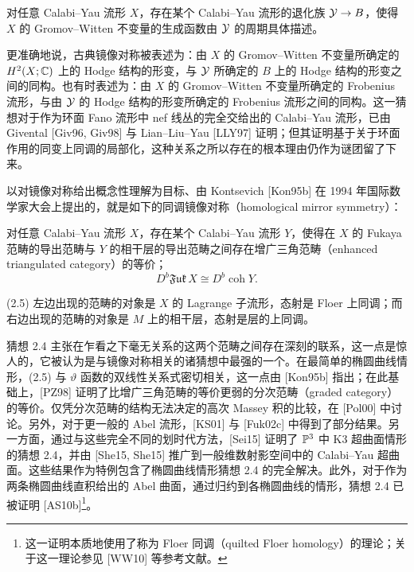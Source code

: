  对任意 Calabi–Yau 流形 $X$，存在某个 Calabi–Yau 流形的退化族 $\mathcal{Y}\to B$，使得 $X$ 的 Gromov–Witten 不变量的生成函数由 $\mathcal{Y}$ 的周期具体描述。

更准确地说，古典镜像对称被表述为：由 $X$ 的 Gromov–Witten 不变量所确定的 $H^2(X;\mathbb{C})$ 上的 Hodge 结构的形变，与 $\mathcal{Y}$ 所确定的 $B$ 上的 Hodge 结构的形变之间的同构。也有时表述为：由 $X$ 的 Gromov–Witten 不变量所确定的 Frobenius 流形，与由 $\mathcal{Y}$ 的 Hodge 结构的形变所确定的 Frobenius 流形之间的同构。这一猜想对于作为环面 Fano 流形中 nef 线丛的完全交给出的 Calabi–Yau 流形，已由 Givental [Giv96, Giv98] 与 Lian–Liu–Yau [LLY97] 证明；但其证明基于关于环面作用的同变上同调的局部化，这种关系之所以存在的根本理由仍作为谜团留了下来。

以对镜像对称给出概念性理解为目标、由 Kontsevich [Kon95b] 在 1994 年国际数学家大会上提出的，就是如下的同调镜像对称（homological mirror symmetry）：

 对任意 Calabi–Yau 流形 $X$，存在某个 Calabi–Yau 流形 $Y$，使得在 $X$ 的 Fukaya 范畴的导出范畴与 $Y$ 的相干层的导出范畴之间存在增广三角范畴（enhanced triangulated category）的等价；
\begin{equation}
    D^b\mathfrak{Fuk}\,X\cong D^b\operatorname{coh}Y. \tag{2.5}
\end{equation}

(2.5) 左边出现的范畴的对象是 $X$ 的 Lagrange 子流形，态射是 Floer 上同调；而右边出现的范畴的对象是 $M$ 上的相干层，态射是层的上同调。


猜想 2.4 主张在乍看之下毫无关系的这两个范畴之间存在深刻的联系，这一点是惊人的，它被认为是与镜像对称相关的诸猜想中最强的一个。在最简单的椭圆曲线情形，(2.5) 与 $\vartheta$ 函数的双线性关系式密切相关，这一点由 [Kon95b] 指出；在此基础上，[PZ98] 证明了比增广三角范畴的等价更弱的分次范畴（graded category）的等价。仅凭分次范畴的结构无法决定的高次 Massey 积的比较，在 [Pol00] 中讨论。另外，对于更一般的 Abel 流形，[KS01] 与 [Fuk02c] 中得到了部分结果。另一方面，通过与这些完全不同的划时代方法，[Sei15] 证明了 $\mathbb{P}^3$ 中 K3 超曲面情形的猜想 2.4，并由 [She15, She15] 推广到一般维数射影空间中的 Calabi–Yau 超曲面。这些结果作为特例包含了椭圆曲线情形猜想 2.4 的完全解决。此外，对于作为两条椭圆曲线直积给出的 Abel 曲面，通过归约到各椭圆曲线的情形，猜想 2.4 已被证明 [AS10b]\footnote{这一证明本质地使用了称为 Floer 同调（quilted Floer homology）的理论；关于这一理论参见 [WW10] 等参考文献。}。


